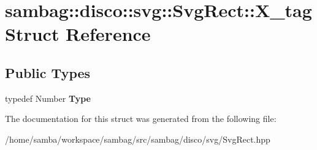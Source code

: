 \hypertarget{structsambag_1_1disco_1_1svg_1_1_svg_rect_1_1_x__tag}{
\section{sambag::disco::svg::SvgRect::X\_\-tag Struct Reference}
\label{structsambag_1_1disco_1_1svg_1_1_svg_rect_1_1_x__tag}
}
\subsection*{Public Types}
\begin{DoxyCompactItemize}
\item 
\hypertarget{structsambag_1_1disco_1_1svg_1_1_svg_rect_1_1_x__tag_af60b12498d90146189a7899820f7515b}{
typedef Number {\bfseries Type}}
\label{structsambag_1_1disco_1_1svg_1_1_svg_rect_1_1_x__tag_af60b12498d90146189a7899820f7515b}

\end{DoxyCompactItemize}


The documentation for this struct was generated from the following file:\begin{DoxyCompactItemize}
\item 
/home/samba/workspace/sambag/src/sambag/disco/svg/SvgRect.hpp\end{DoxyCompactItemize}
